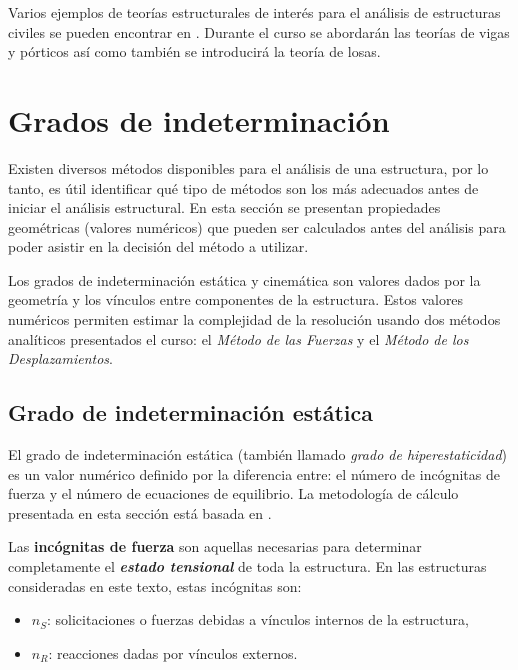 Varios ejemplos de teorías estructurales de interés para el análisis de estructuras civiles se pueden encontrar en \citep{Onate2013}. %
%
Durante el curso se abordarán las teorías de vigas y pórticos así como también se introducirá la teoría de losas.



\section{Grados de indeterminación}

Existen diversos métodos disponibles para el análisis de una estructura, por lo tanto, es útil identificar qué tipo de métodos son los más adecuados {\cambio antes de iniciar el análisis estructural. %
En esta sección se presentan propiedades geométricas (valores numéricos) que pueden ser calculados antes del análisis para poder asistir en la decisión del método a utilizar.}

Los grados de indeterminación estática y cinemática son valores dados por la geometría y los vínculos entre componentes de la estructura. %
%
Estos valores numéricos permiten estimar la complejidad de la resolución usando dos métodos analíticos presentados el curso: el \textit{Método de las Fuerzas} y el \textit{Método de los Desplazamientos}. %
%


\subsection{Grado de indeterminación estática}

El grado de indeterminación estática (también llamado \textit{grado de hiperestaticidad}) es un valor numérico definido por la diferencia entre: el número de incógnitas de fuerza y el número de ecuaciones de equilibrio. %
%
{\cambio 
La metodología de cálculo presentada en esta sección está basada en \citep{CerveraRuiz2002ii}}.

Las \textbf{incógnitas de fuerza} son aquellas necesarias para determinar completamente el \textit{\textbf{estado tensional}} de toda la estructura. En las estructuras consideradas en este texto, estas incógnitas son:
%
\begin{itemize}
	\item $n_S$: solicitaciones o fuerzas debidas a vínculos internos de la estructura,
	\item $n_R$: reacciones dadas por vínculos externos.
\end{itemize}


